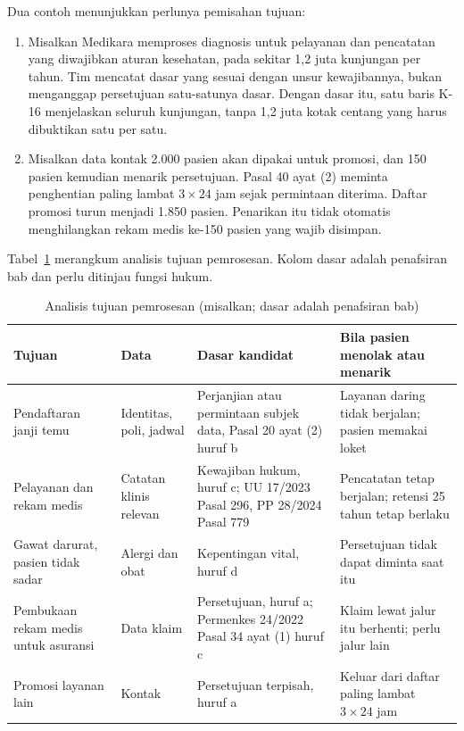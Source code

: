 Dua contoh menunjukkan perlunya pemisahan tujuan:
\begin{enumerate}
  \item Misalkan Medikara memproses diagnosis untuk pelayanan dan pencatatan yang diwajibkan aturan
  kesehatan, pada sekitar 1,2 juta kunjungan per tahun. Tim mencatat dasar yang sesuai dengan unsur
  kewajibannya, bukan menganggap persetujuan satu-satunya dasar. Dengan dasar itu, satu baris K-16
  menjelaskan seluruh kunjungan, tanpa 1,2 juta kotak centang yang harus dibuktikan satu per satu.
  \item Misalkan data kontak 2.000 pasien akan dipakai untuk promosi, dan 150 pasien kemudian
  menarik persetujuan. Pasal 40 ayat (2) meminta penghentian paling lambat $3 \times 24$ jam sejak
  permintaan diterima. Daftar promosi turun menjadi 1.850 pasien. Penarikan itu tidak otomatis
  menghilangkan rekam medis ke-150 pasien yang wajib disimpan.
\end{enumerate}

Tabel~\ref{tab:ch07-tujuan} merangkum analisis tujuan pemrosesan. Kolom dasar adalah penafsiran bab
dan perlu ditinjau fungsi hukum.

\begin{table}[!htb]
  \centering\small
  \caption{Analisis tujuan pemrosesan (misalkan; dasar adalah penafsiran bab)}
  \label{tab:ch07-tujuan}
  \begin{tabularx}{\textwidth}{|>{\raggedright\arraybackslash}p{}|>{\raggedright\arraybackslash}p{}|>{\raggedright\arraybackslash}X|>{\raggedright\arraybackslash}X|}
    \hline
    \textbf{Tujuan} & \textbf{Data} & \textbf{Dasar kandidat} & \textbf{Bila pasien menolak atau
    menarik} \\ \hline
    Pendaftaran janji temu & Identitas, poli, jadwal & Perjanjian atau permintaan subjek data, Pasal
    20 ayat (2) huruf b & Layanan daring tidak berjalan; pasien memakai loket \\ \hline
    Pelayanan dan rekam medis & Catatan klinis relevan & Kewajiban hukum, huruf c; UU 17/2023 Pasal
    296, PP 28/2024 Pasal 779 & Pencatatan tetap berjalan; retensi 25 tahun tetap berlaku \\ \hline
    Gawat darurat, pasien tidak sadar & Alergi dan obat & Kepentingan vital, huruf d & Persetujuan
    tidak dapat diminta saat itu \\ \hline
    Pembukaan rekam medis untuk asuransi & Data klaim & Persetujuan, huruf a; Permenkes 24/2022
    Pasal 34 ayat (1) huruf c & Klaim lewat jalur itu berhenti; perlu jalur lain \\ \hline
    Promosi layanan lain & Kontak & Persetujuan terpisah, huruf a & Keluar dari daftar paling lambat
    $3 \times 24$ jam \\ \hline
  \end{tabularx}
\end{table}


